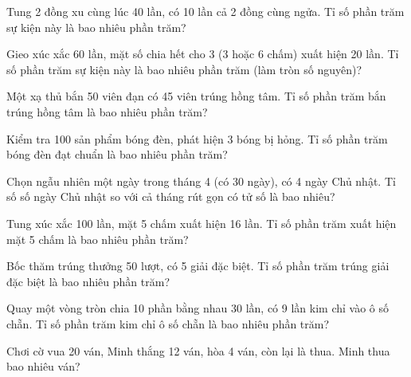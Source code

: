 \begin{ex}
  Tung 2 đồng xu cùng lúc 40 lần, có 10 lần cả 2 đồng cùng ngửa. Tỉ số phần trăm sự kiện này là bao nhiêu phần trăm?
\end{ex}

\begin{ex}
  Gieo xúc xắc 60 lần, mặt số chia hết cho 3 (3 hoặc 6 chấm) xuất hiện 20 lần. Tỉ số phần trăm sự kiện này là bao nhiêu phần trăm (làm tròn số nguyên)?
\end{ex}

\begin{ex}
  Một xạ thủ bắn 50 viên đạn có 45 viên trúng hồng tâm. Tỉ số phần trăm bắn trúng hồng tâm là bao nhiêu phần trăm?
\end{ex}

\begin{ex}
  Kiểm tra 100 sản phẩm bóng đèn, phát hiện 3 bóng bị hỏng. Tỉ số phần trăm bóng đèn đạt chuẩn là bao nhiêu phần trăm?
\end{ex}

\begin{ex}
  Chọn ngẫu nhiên một ngày trong tháng 4 (có 30 ngày), có 4 ngày Chủ nhật. Tỉ số số ngày Chủ nhật so với cả tháng rút gọn có tử số là bao nhiêu?
\end{ex}

\begin{ex}
  Tung xúc xắc 100 lần, mặt 5 chấm xuất hiện 16 lần. Tỉ số phần trăm xuất hiện mặt 5 chấm là bao nhiêu phần trăm?
\end{ex}

\begin{ex}
  Bốc thăm trúng thưởng 50 lượt, có 5 giải đặc biệt. Tỉ số phần trăm trúng giải đặc biệt là bao nhiêu phần trăm?
\end{ex}

\begin{ex}
  Quay một vòng tròn chia 10 phần bằng nhau 30 lần, có 9 lần kim chỉ vào ô số chẵn. Tỉ số phần trăm kim chỉ ô số chẵn là bao nhiêu phần trăm?
\end{ex}

\begin{ex}
  Chơi cờ vua 20 ván, Minh thắng 12 ván, hòa 4 ván, còn lại là thua. Minh thua bao nhiêu ván?
\end{ex}
